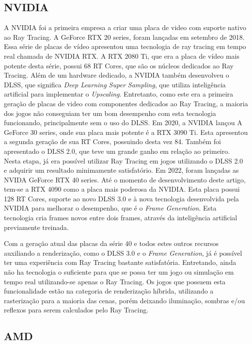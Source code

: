 \documentclass[journal]{IEEEtran}
\begin{document}
\subsection{NVIDIA}
A NVIDIA foi a primeira empresa a criar uma placa de video com suporte nativo ao
Ray Tracing. A GeForce RTX 20 series, foram lançadas em setembro de 2018. Essa 
série de placas de vídeo apresentou uma tecnologia de ray tracing em tempo real 
chamada de NVIDIA RTX. A RTX 2080 Ti, que era a placa de vídeo mais potente
desta série, possui 68 RT Cores, que são os núcleos dedicados ao Ray Tracing.
Além de um hardware dedicado, a NVIDIA também desenvolveu o DLSS, que significa
\emph{Deep Learning Super Sampling}, que utiliza inteligência artificial para
implementar o \emph{Upscaling}. Entretanto, como este era a primeira geração
de placas de video com componentes dedicados ao Ray Tracing, a maioria dos
jogos não conseguiam ter um bom desempenho com esta tecnologia funcionando,
principalmente sem o uso do DLSS. Em 2020, a NVIDIA lançou A GeForce 30
series, onde sua placa mais potente é a RTX 3090 Ti. Esta apresentou a
segunda geração de sua RT Cores, possuindo desta vez 84. Também foi apresentado
o DLSS 2.0, que teve um grande ganho em relação ao primeiro. Nesta etapa,
já era possível utilizar Ray Tracing em jogos utilizando o DLSS 2.0 e
adquirir um resultado minimamente satisfatório. Em 2022, foram lançadas as
NVIDA GeForce RTX 40 series. Até o momento de desenvolvimento deste artigo,
tem-se a RTX 4090 como a placa mais poderosa da NVIDIA. Esta placa possui
128 RT Cores, suporte ao novo DLSS 3.0 e à nova tecnologia desenvolvida
pela NVIDIA para melhorar o desempenho, que é o \emph{Frame Generation}.
Esta tecnologia cria frames novos entre dois frames, através da inteligência
artificial previamente treinada. 

Com a geração atual das placas da série 40 e todos estes outros recursos auxiliando
a renderização, como o DLSS 3.0 e o \emph{Frame Generation}, já é possível ter uma
experiência com Ray Tracing bastante satisfatória. Entretando, ainda não ha 
tecnologia o suficiente para que se possa ter um jogo ou simulação em
tempo real utilizando-se apenas o Ray Tracing. Os jogos que possuem esta
funcionalidade estão na categoria de renderização híbrida, utilizando a
rasterização para a maioria das cenas, porém deixando iluminação, sombras e/ou
reflexos para serem calculados pelo Ray Tracing.

\subsection{AMD}
\end{document}
